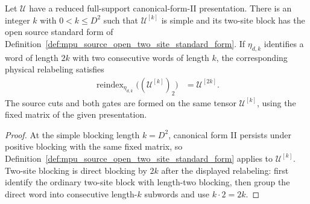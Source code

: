 \begin{lemma}
    \label{thm:mpu_bounded_source_open_standard_form}
    \leanok
    Let $\mathcal U$ have a reduced full-support canonical-form-II
    presentation. There is an integer $k$ with $0<k\leq D^2$ such that
    $\mathcal U^{[k]}$ is simple and its two-site block has the open source
    standard form of Definition~\ref{def:mpu_source_open_two_site_standard_form}.
    If $\eta_{d,k}$ identifies a word of length $2k$ with two consecutive
    words of length $k$, the corresponding physical relabeling satisfies
    \begin{align}
        \operatorname{reindex}_{\eta_{d,k}}
        \bigl((\mathcal U^{[k]})_2\bigr)
         & =\mathcal U^{[2k]}.
    \end{align}
    The source cuts and both gates are formed on the same tensor
    $\mathcal U^{[k]}$, using the fixed matrix of the given presentation.
\end{lemma}

\begin{proof}\leanok
    At the simple blocking length $k=D^2$,
    canonical form II persists under positive blocking with the same
    fixed matrix, so Definition~\ref{def:mpu_source_open_two_site_standard_form} applies to
    $\mathcal U^{[k]}$. Two-site blocking is direct blocking by $2k$ after
    the displayed relabeling: first identify the ordinary two-site block
    with length-two blocking, then group the direct word into consecutive
    length-$k$ subwords and use $k\cdot2=2k$.
\end{proof}


